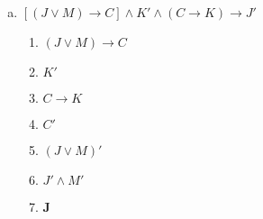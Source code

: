 \documentclass[a4paper, 12pt, addpoints]{exam}
\begin{document}
\begin{questions}
\begin{resp}
\begin{enumerate}[a)]
\begin{multicols}{2}
        \begin{enumerate}[1.]
          \item $(T \rightarrow U)'$
          \item $(E \lor C')'$
          \item $(T' \lor U)'$
          \item $(T')' \land U'$
          \item $E' \land (C')'$
          \item $U'$
          \item $(C')'$
          \item $C$
          \item $\boldsymbol{U' \land C}$
        \end{enumerate}
        
        \columnbreak

        \begin{enumerate}[\ding{32}]
          \item (hip)
          \item (hip)
          \item (1, condicional)
          \item (3, lei de Morgan)
          \item (2, lei de Morgan)
          \item (4, simplificação)
          \item (5, simplificação)
          \item (7, dupla negação)
          \item \textbf{(6, 8, conjunção)}
        \end{enumerate}

      \end{multicols}

      \item $[(J \lor M) \rightarrow C] \land K' \land (C \rightarrow K) \rightarrow J'$
      \begin{multicols}{2}

        \begin{enumerate}[1.]
          \item $(J \lor M) \rightarrow C$
          \item $K'$
          \item $C \rightarrow K$
          \item $C'$
          \item $(J \lor M)'$
          \item $J' \land M'$
          \item $\boldsymbol{J}$
        \end{enumerate}
        

\end{multicols}
\end{enumerate}
\end{resp}
\end{questions}
\end{document}
